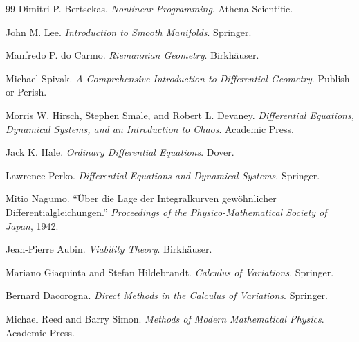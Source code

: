 \documentclass[11pt]{book}
\numberwithin{equation}{chapter}
\theoremstyle{definition}
\theoremstyle{plain}
\begin{document}
\begin{thebibliography}{99}
Dimitri P. Bertsekas.
\textit{Nonlinear Programming}.
Athena Scientific.


John M. Lee.
\textit{Introduction to Smooth Manifolds}.
Springer.

Manfredo P. do Carmo.
\textit{Riemannian Geometry}.
Birkhäuser.

Michael Spivak.
\textit{A Comprehensive Introduction to Differential Geometry}.
Publish or Perish.


Morris W. Hirsch, Stephen Smale, and Robert L. Devaney.
\textit{Differential Equations, Dynamical Systems, and an Introduction to Chaos}.
Academic Press.

Jack K. Hale.
\textit{Ordinary Differential Equations}.
Dover.

Lawrence Perko.
\textit{Differential Equations and Dynamical Systems}.
Springer.


Mitio Nagumo.
``Über die Lage der Integralkurven gewöhnlicher Differentialgleichungen.''
\textit{Proceedings of the Physico-Mathematical Society of Japan},
1942.

Jean-Pierre Aubin.
\textit{Viability Theory}.
Birkhäuser.


Mariano Giaquinta and Stefan Hildebrandt.
\textit{Calculus of Variations}.
Springer.

Bernard Dacorogna.
\textit{Direct Methods in the Calculus of Variations}.
Springer.


Michael Reed and Barry Simon.
\textit{Methods of Modern Mathematical Physics}.
Academic Press.


\end{thebibliography}
\end{document}
